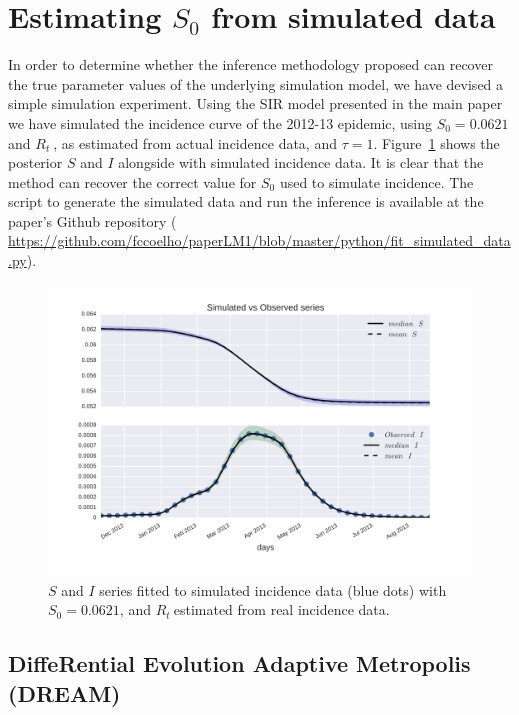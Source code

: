 \documentclass[a4paper,10pt]{article}
\def \rr {$R_{t}\:$}
\begin{document}
\section*{Estimating $S_0$ from simulated data}

In order to determine whether the inference methodology proposed can 
recover the true parameter values of the underlying simulation model, we have 
devised a simple simulation experiment.
Using the SIR model presented in the main paper we have simulated the incidence 
curve of the  2012-13 epidemic, using 
$S_0 = 0.0621$ and \rr, as estimated from actual incidence data, and $\tau=1$. 
Figure~\ref{fig:sim_data} shows the posterior $S$ and $I$ alongside with 
simulated incidence data.
It is clear that the method can recover the correct value for $S_0$ 
used to   simulate incidence.
The script to generate the simulated data and run the inference is available at 
the paper's Github repository 
(\url{
https://github.com/fccoelho/paperLM1/blob/master/python/fit_simulated_data.py}).

\begin{figure}[!ht]
 \centering
 \includegraphics[width=14cm]{./plots/Sim_DengueS2012_11_series.png}
 \caption{$S$ and $I$ series fitted to simulated incidence data (blue dots) 
with $S_0=0.0621$, and \rr estimated from real incidence data.}
 \label{fig:sim_data}
\end{figure}

\subsection*{DiffeRential Evolution Adaptive Metropolis (DREAM)}
\end{document}
